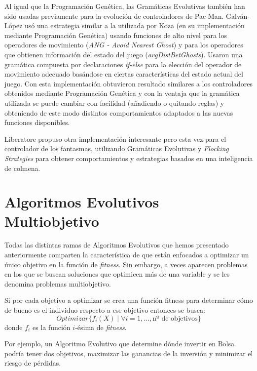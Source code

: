 \blankline

Al igual que la Programación Genética, las Gramáticas Evolutivas también han sido usadas previamente para la evolución de controladores de Pac-Man. Galván-López\cite{galvan2010evolving} usó una estrategia similar a la utilizada por Koza (en su implementación mediante Programación Genética) usando funciones de alto nivel para los operadores de movimiento (\textit{ANG - Avoid Nearest Ghost}) y para los operadores que obtienen información del estado del juego (\textit{avgDistBetGhosts}). Usaron una gramática compuesta por declaraciones \textit{if-else} para la elección del operador de movimiento adecuado basándose en ciertas características del estado actual del juego. Con esta implementación obtuvieron resultado similares a los controladores obtenidos mediante Programación Genética y con la ventaja que la gramática utilizada se puede cambiar con facilidad (añadiendo o quitando reglas) y obteniendo de este modo distintos comportamientos adaptados a las nuevas funciones disponibles.

Liberatore\cite{Liberatore2014} propuso otra implementación interesante pero esta vez para el controlador de los fantasmas, utilizando Gramáticas Evolutivas y \textit{Flocking Strategies} para obtener comportamientos y estrategias basados en una inteligencia de colmena.

\section{Algoritmos Evolutivos Multiobjetivo}
Todas las distintas ramas de Algoritmos Evolutivos que hemos presentado anteriormente comparten la característica de que están enfocados a optimizar  un único objetivo en la  función de \textit{fitness}. Sin embargo, a veces aparecen problemas en los que se buscan soluciones que optimicen más de una variable y se les denomina problemas multiobjetivo.

Si por cada objetivo a optimizar se crea una función fitness para determinar cómo de bueno es el individuo respecto a ese objetivo entonces se busca:
\begin{equation}
Optimizar \{f_i(X) \mid \forall i = 1, \dots, \textrm{nº de objetivos}\}
\end{equation}
donde $f_i$ es la función $i$-ésima de \textit{fitness}.

Por ejemplo, un Algoritmo Evolutivo que determine dónde invertir en Bolsa podría tener dos objetivos, maximizar las ganancias de la inversión y minimizar el riesgo de pérdidas.

